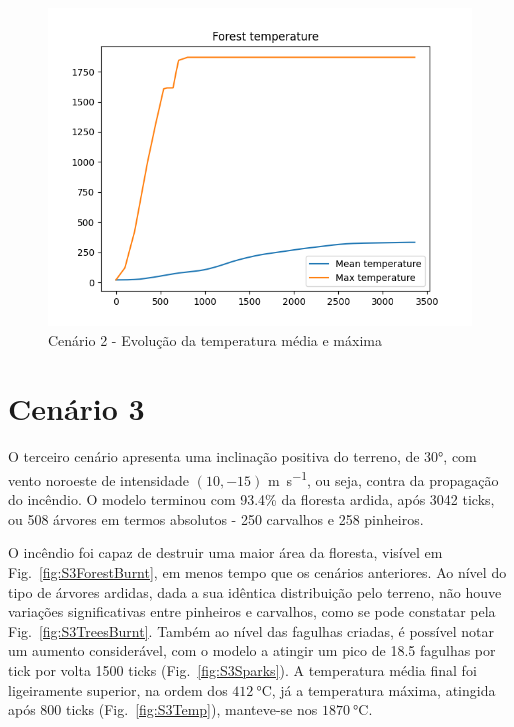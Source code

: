 \begin{figure}[H]
    \centering
    \includegraphics[width=\textwidth]{src/runs/scenario2/temperature.png}
    \caption{Cenário 2 - Evolução da temperatura média e máxima}
    \label{fig:S2Temp}
\end{figure}

\section{Cenário 3}\label{sec:scenario3}

O terceiro cenário apresenta uma inclinação positiva do terreno, de \ang{30}, com vento noroeste de intensidade $(10, -15)$ \si{\meter\per\second}, ou seja, contra da propagação do incêndio. O modelo terminou com 93.4\% da floresta ardida, após 3042 ticks, ou 508 árvores em termos absolutos - 250 carvalhos e 258 pinheiros. 

O incêndio foi capaz de destruir uma maior área da floresta, visível em Fig.~\ref{fig:S3ForestBurnt}, em menos tempo que os cenários anteriores. Ao nível do tipo de árvores ardidas, dada a sua idêntica distribuição pelo terreno, não houve variações significativas entre pinheiros e carvalhos, como se pode constatar pela Fig.~\ref{fig:S3TreesBurnt}. Também ao nível das fagulhas criadas, é possível notar um aumento considerável, com o modelo a atingir um pico de 18.5 fagulhas por tick por volta 
1500 ticks (Fig.~\ref{fig:S3Sparks}). A temperatura média final foi ligeiramente superior, na ordem dos $\SI{412}{\degreeCelsius}$, já a temperatura máxima, atingida após 800 ticks (Fig.~\ref{fig:S3Temp}), manteve-se nos $\SI{1870}{\degreeCelsius}$.

